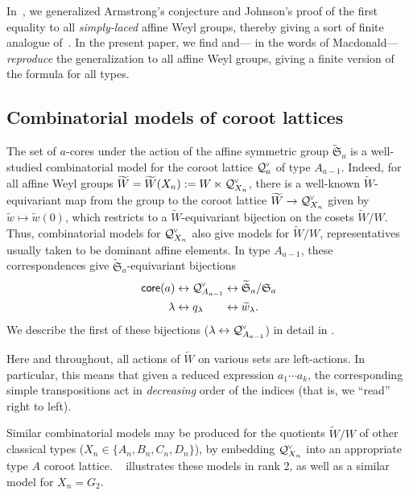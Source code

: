 \documentclass[ALCO,published]{cedram}
\newcommand{\chk}[1]{#1^{\normalfont\smash{\scalebox{.5}[.5]{\rotatebox{90}{\textbf{\textless}}}}}}
\newcommand{\wa}{\widetilde{W}}
\newcommand{\Q}{\mathcal{Q}}
\newcommand{\core}{{\sf core}}
\newcommand{\waf}{\widetilde{w}}
\begin{document}
In~\cite{thiel2017strange}, we generalized Armstrong's conjecture and Johnson's proof of the first equality to all \emph{simply-laced} affine Weyl groups, thereby giving a sort of finite analogue of~. In the present paper, we find and--- in the words of Macdonald--- \emph{reproduce} the generalization to all affine Weyl groups, giving a finite version of the formula for all types. 


\subsection{Combinatorial models of coroot lattices}

The set of $a$-cores under the action of the affine symmetric group $\widetilde{\mathfrak{S}}_a$ is a well-studied combinatorial model for the coroot lattice $\chk{\Q}_{a}$ of type $A_{a-1}$. Indeed, for all affine Weyl groups $\wa=\wa(X_n) := W \ltimes \chk{\Q}_{X_n} $, there is a well-known $\wa$-equivariant map from the group to the coroot lattice $\wa \to \chk{\Q}_{X_n}$ given by $\waf \mapsto \waf(0)$, which restricts to a $\wa$-equivariant bijection on the cosets $\wa/W$. Thus, combinatorial models for $\chk{\Q}_{X_n}$ also give models for $\wa/W$, representatives usually taken to be dominant affine elements.  In type $A_{a-1}$, these correspondences give $\widetilde{\mathfrak{S}}_a$-equivariant bijections
\begin{equation}
\begin{alignedat}{2}
\core(a) &\leftrightarrow \chk{\Q}_{A_{a-1}} &&\leftrightarrow \widetilde{\mathfrak{S}}_a / \mathfrak{S}_{a} \\
 \lambda &\leftrightarrow q_\lambda &&\leftrightarrow \waf_\lambda.
\end{alignedat}
\label{eq:core_to_coroot}
\end{equation}
We describe the first of these bijections ($\lambda\leftrightarrow \chk{\Q}_{A_{a-1}}$) in detail in .

\begin{rema}
Here and throughout, all actions of $\wa$ on various sets are left-actions. In particular, this means that given a reduced expression $a_1\cdots a_k$, the corresponding simple transpositions act in \emph{decreasing} order of the indices (that is, we ``read'' right to left).
\end{rema}

Similar combinatorial models may be produced for the quotients $ \wa/W$ of other classical types ($X_n \in \{A_n,B_n,C_n,D_n\}$), by embedding $\chk{\Q}_{X_n}$ into an appropriate type $A$ coroot lattice. ~ illustrates these models in rank 2, as well as a similar model for $X_n=G_2$.
\end{document}

